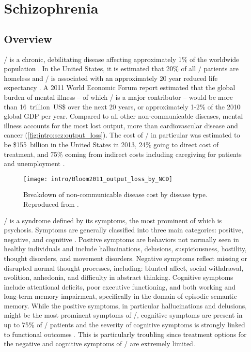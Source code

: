 \acresetall
\chapter{Schizophrenia}
\label{ch:intro:scz}
\section*{Overview}
\Scz/ is a chronic, debilitating disease affecting approximately 1\% of the worldwide population \citep{McGrath2008}.
In the United States, it is estimated that 20\% of all \scz/ patients are homeless and \scz/ is associated with an approximately 20 year reduced life expectancy \citep{Folsom2005, Tiihonen2009}.
A 2011 World Economic Forum report \citep{Bloom2011} estimated that the global burden of mental illness -- of which \scz/ is a major contributor -- would be more than 16~trillion~US\$ over the next 20 years, or approximately 1-2\% of the 2010 global GDP per year.
Compared to all other non-communicable diseases, mental illness accounts for the most lost output, more than cardiovascular disease and cancer (\autoref{fig:intro:scz:output_loss}).
The cost of \scz/ in particular was estimated to be \$155~billion in the United States in 2013, 24\% going to direct cost of treatment, and 75\% coming from indirect costs including caregiving for patients and unemployment \citep{Cloutier2016}. 
\begin{figure}
	\centering
	\texttt{[image: intro/Bloom2011\_output\_loss\_by\_NCD]}
	\caption[Breakdown of non-communicable disease cost by disease type]{Breakdown of non-communicable disease cost by disease type.
	Reproduced from \citet{Bloom2011}.}
	\label{fig:intro:scz:output_loss}
\end{figure}

\Scz/ is a syndrome defined by its symptoms, the most prominent of which is psychosis.
Symptoms are generally classified into three main categories: positive, negative, and cognitive \citep{Kay1982}.
Positive symptoms are behaviors not normally seen in healthy individuals and include hallucinations, delusions, suspiciousness, hostility, thought disorders, and movement disorders.
Negative symptoms reflect missing or disrupted normal thought processes, including: blunted affect, social withdrawal, avolition, anhedonia, and difficulty in abstract thinking.
Cognitive symptoms include attentional deficits, poor executive functioning, and both working and long-term memory impairment, specifically in the domain of episodic semantic memory.
While the positive symptoms, in particular hallucinations and delusions, might be the most prominent symptoms of \scz/, cognitive symptoms are present in up to 75\% of \scz/ patients and the severity of cognitive symptoms is strongly linked to functional outcomes \citep{O'Carroll2000, Green1996, Keefe2007}.
This is particularly troubling since treatment options for the negative and cognitive symptoms of \scz/ are extremely limited.

